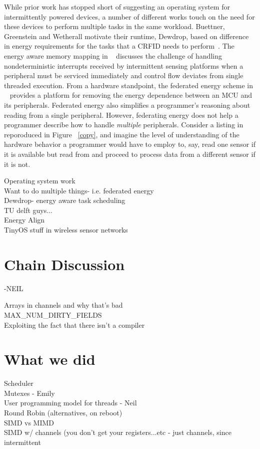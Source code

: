 \documentclass[11pt]{sensys-proc}
\begin{document}
While prior work has stopped short of suggesting an operating system for intermittently
powered devices, a number of different works touch on the need for these devices to
perform multiple tasks in the same workload. Buettner, Greenstein and Wetherall motivate
their runtime, Dewdrop, based on difference in energy requirements for the tasks that a
CRFID needs to perform~\cite{dewdrop}. The energy aware memory mapping in ~\cite{Aware}
discusses the challenge of handling nondeterministic interrupts received by intermittent
sensing platforms when a peripheral must be serviced immediately and control flow deviates
from single threaded execution. From a hardware standpoint, the federated energy scheme in
~\cite{ufop} provides a platform for removing the energy dependence between an MCU and its
peripherals. Federated energy also simplifies a programmer's reasoning about reading from
a single peripheral. However, federating energy does not help a programmer describe how to
handle {\em multiple} peripherals. Consider a listing in
~\cite{ufop} reporoduced in Figure ~\ref{copy}, and imagine the level of understanding
of the hardware behavior a programmer would have to employ to, say, read one sensor if it
is available but read from and proceed to process data from a different sensor if it is not. 

Operating system work\\
Want to do multiple things- i.e. federated energy \\
Dewdrop- energy aware task scheduling\\
TU delft guys...\\
Energy Align\\
TinyOS stuff in wireless sensor networks\\

\section{Chain Discussion} -NEIL

Arrays in channels and why that's bad\\
MAX\_NUM\_DIRTY\_FIELDS\\
Exploiting the fact that there isn't a compiler\\


\section{What we did} %
Scheduler\\
Mutexes - Emily\\
User programming model for threads - Neil\\
Round Robin (alternatives, on reboot)\\
SIMD vs MIMD\\
SIMD w/ channels (you don't get your registers...etc -
    just channels, since intermittent\\
\end{document}
